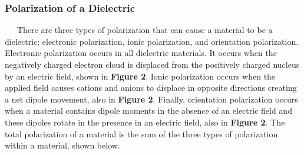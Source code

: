 \documentclass{article}
\begin{document}
\subsubsection*{Polarization of a Dielectric}
\ \ \ There are three types of polarization that can cause a material to be a dielectric: electronic polarization, ionic polarization, and orientation polarization. Electronic polarization occurs in all dielectric materials. It occurs when the negatively charged electron cloud is displaced from the positively charged nucleus by an electric field, shown in \textbf{Figure 2}. Ionic polarization occurs when the applied field causes cations and anions to displace in opposite directions creating a net dipole movement, also in \textbf{Figure 2}. Finally, orientation polarization occurs when a material contains dipole moments in the absence of an electric field and these dipoles rotate in the presence in an electric field, also in \textbf{Figure 2}. The total polarization of a material is the sum of the three types of polarization within a material, shown below.
\end{document}
